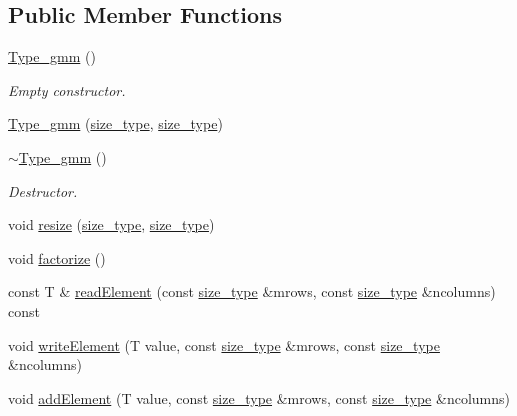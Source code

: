 \subsection*{Public Member Functions}
\begin{DoxyCompactItemize}
\item 
\hyperlink{classlmx_1_1Type__gmm_a36a2960d8cdf464b6e38e5aa3d3cb18c}{Type\-\_\-gmm} ()
\begin{DoxyCompactList}\small\item\em Empty constructor. \end{DoxyCompactList}\item 
\hyperlink{classlmx_1_1Type__gmm_a4103754694cea050ea39dbb498882d3b}{Type\-\_\-gmm} (\hyperlink{lmx__mat__data_8h_a49b489a408a211a90e766329c0732d7b}{size\-\_\-type}, \hyperlink{lmx__mat__data_8h_a49b489a408a211a90e766329c0732d7b}{size\-\_\-type})
\item 
\hyperlink{classlmx_1_1Type__gmm_aa898610cccfb0460ce74f5788856bd9e}{$\sim$\-Type\-\_\-gmm} ()
\begin{DoxyCompactList}\small\item\em Destructor. \end{DoxyCompactList}\item 
void \hyperlink{classlmx_1_1Type__gmm_a2bda575c6f8e0cf7e340c5b2070cadc2}{resize} (\hyperlink{lmx__mat__data_8h_a49b489a408a211a90e766329c0732d7b}{size\-\_\-type}, \hyperlink{lmx__mat__data_8h_a49b489a408a211a90e766329c0732d7b}{size\-\_\-type})
\item 
void \hyperlink{classlmx_1_1Type__gmm_a0bc2cb137b550114d39577510a018e97}{factorize} ()
\item 
const T \& \hyperlink{classlmx_1_1Type__gmm_a39a1e8a1f0cfeb6e95a3a83a89442e13}{read\-Element} (const \hyperlink{lmx__mat__data_8h_a49b489a408a211a90e766329c0732d7b}{size\-\_\-type} \&mrows, const \hyperlink{lmx__mat__data_8h_a49b489a408a211a90e766329c0732d7b}{size\-\_\-type} \&ncolumns) const 
\item 
void \hyperlink{classlmx_1_1Type__gmm_a53de84b0522415262e902ffa42157c3c}{write\-Element} (T value, const \hyperlink{lmx__mat__data_8h_a49b489a408a211a90e766329c0732d7b}{size\-\_\-type} \&mrows, const \hyperlink{lmx__mat__data_8h_a49b489a408a211a90e766329c0732d7b}{size\-\_\-type} \&ncolumns)
\item 
void \hyperlink{classlmx_1_1Type__gmm_af7e0661838b9cb1a325846913689ff24}{add\-Element} (T value, const \hyperlink{lmx__mat__data_8h_a49b489a408a211a90e766329c0732d7b}{size\-\_\-type} \&mrows, const \hyperlink{lmx__mat__data_8h_a49b489a408a211a90e766329c0732d7b}{size\-\_\-type} \&ncolumns)

\end{DoxyCompactItemize}
